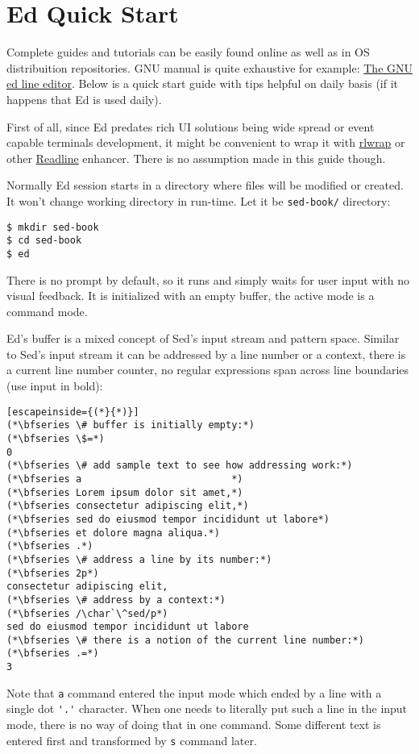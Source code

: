\section{Ed Quick Start}
Complete guides and tutorials can be easily found online as well as
in OS distribuition repositories. GNU manual is quite exhaustive for
example: \href{https://www.gnu.org/software/ed/manual/ed_manual.html}
{The GNU ed line editor}.
Below is a quick start guide with tips helpful on daily basis (if it
happens that Ed is used daily).

First of all, since Ed predates rich UI solutions being wide spread
or event capable terminals development, it might be convenient to
wrap it with
\href{https://github.com/hanslub42/rlwrap}{rlwrap}
or other
\href{https://tiswww.cwru.edu/php/chet/readline/rltop.html}{Readline}
enhancer. There is no assumption made in this guide though.

Normally Ed session starts in a directory where files will be modified or
created. It won't change working directory in run-time.
Let it be \lstinline{sed-book/} directory:
\begin{lstlisting}
$ mkdir sed-book
$ cd sed-book
$ ed
\end{lstlisting}
There is no prompt by default, so it runs and simply waits for user input
with no visual feedback. It is initialized with an empty buffer, the
active mode is a command mode.

Ed's buffer is a mixed concept of Sed's input stream and pattern space.
Similar to Sed's input stream it can be addressed by a line number or
a context, there is a current line number counter, no regular expressions
span across line boundaries (use input in bold):
\begin{lstlisting}[escapeinside={(*}{*)}]
(*\bfseries \# buffer is initially empty:*)
(*\bfseries \$=*)
0
(*\bfseries \# add sample text to see how addressing work:*)
(*\bfseries a                          *)
(*\bfseries Lorem ipsum dolor sit amet,*)
(*\bfseries consectetur adipiscing elit,*)
(*\bfseries sed do eiusmod tempor incididunt ut labore*)
(*\bfseries et dolore magna aliqua.*)
(*\bfseries .*)
(*\bfseries \# address a line by its number:*)
(*\bfseries 2p*)
consectetur adipiscing elit,
(*\bfseries \# address by a context:*)
(*\bfseries /\char`\^sed/p*)
sed do eiusmod tempor incididunt ut labore
(*\bfseries \# there is a notion of the current line number:*)
(*\bfseries .=*)
3
\end{lstlisting}

Note that \lstinline{a} command entered the input mode which ended by a line
with a single dot \lstinline{'.'} character.
When one needs to literally put such a line in the input mode,
there is no way of doing that in one command. Some different text is
entered first and transformed by \lstinline{s} command later.

